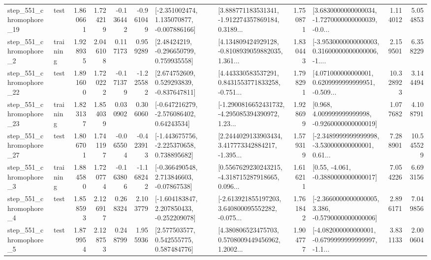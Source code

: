 \begin{tabular}{llrrrrllrlrr}
  step\_551\_chromophore\_19 &      test &      1.860661 &    1.724219 &     -0.136442 & -0.961049 &   [-2.351002474, 1.135070877, -0.007886166] &  [3.888771183531341, -1.912274357869184, 0.3189... &       1.750871 &  [3.6830000000000034, -1.7270000000000039, -0.0... &            1.114012 &          5.054853 \\
   step\_551\_chromophore\_2 &  training &      1.928935 &    2.046108 &      0.117173 &  0.959289 &     [2.48424219, -0.296650799, 0.759935558] &  [4.134809424929128, -0.8108939059882035, 1.361... &       1.830443 &  [-3.9530000000000003, 0.31600000000000006, -1.... &            2.159501 &          6.358229 \\
  step\_551\_chromophore\_22 &      test &      1.891600 &    1.720222 &     -0.171379 & -1.225582 &    [2.674752609, 0.529293839, -0.837647811] &  [4.443330583537291, 0.8431553771833258, -0.751... &       1.798291 &  [4.071000000000001, 0.6209999999999951, -0.509... &           10.328923 &          3.144494 \\
  step\_551\_chromophore\_23 &  training &      1.823137 &    1.854039 &      0.030902 &  0.306060 &    [-0.647216279, -2.576086402, 0.64243534] &  [-1.2900816652431732, -4.295085394390972, 1.23... &       1.928699 &    [0.968, 4.009999999999998, -0.9260000000000019] &            1.077682 &          4.108791 \\
  step\_551\_chromophore\_27 &      test &      1.806701 &    1.741197 &     -0.065504 & -0.423913 &   [-1.443675756, -2.225370658, 0.738895682] &  [2.2444029133903434, 3.417773342884217, -1.395... &       1.579319 &  [-2.3489999999999998, -3.530000000000001, 0.61... &            7.288901 &         10.545529 \\
   step\_551\_chromophore\_3 &  training &      1.884580 &    1.720774 &     -0.163806 & -1.168242 &    [-0.366490548, 2.713846603, -0.07867538] &  [0.5567629230243215, -4.318715287918665, 0.096... &       1.616211 &                [0.55, -4.061, -0.3880000000000017] &            7.054226 &          6.693156 \\
   step\_551\_chromophore\_4 &      test &      1.858593 &    2.126917 &      0.268324 &  2.103779 &   [-1.604183847, 2.207850433, -0.252209078] &  [-2.613921855197203, 3.640800095552282, -0.075... &       1.761842 &  [-2.3660000000000005, 3.386, -0.5790000000000006] &            2.896171 &          7.049856 \\
   step\_551\_chromophore\_5 &      test &      1.879954 &    2.128753 &      0.248799 &  1.955936 &     [2.577503577, 0.542555775, 0.587484776] &  [4.380806523475703, 0.5708009449456962, 1.2002... &       1.904777 &  [-4.082000000000001, -0.6799999999999997, -1.1... &            3.831133 &          2.000604 \\

\end{tabular}
